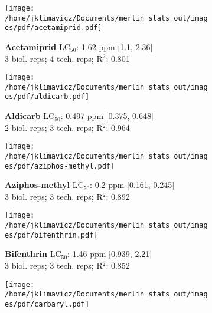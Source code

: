 \documentclass{article}
\author{James Klimavicz}
\date{\today}
\begin{document}
\begin{figure}[thp!]
   \begin{subfigure}{0.500\textwidth}
      \centering
      \texttt{[image: /home/jklimavicz/Documents/merlin\_stats\_out/images/pdf/acetamiprid.pdf]}
      \vspace{-0.05cm}
      \caption*{\textbf{Acetamiprid} LC$_{50}$: 1.62 ppm [1.1, 2.36] \\ 
3 biol. reps; 4 tech. reps; R$^2$: 0.801}
      \vspace{0.1cm}
   \end{subfigure}%
   \begin{subfigure}{0.500\textwidth}
      \centering
      \texttt{[image: /home/jklimavicz/Documents/merlin\_stats\_out/images/pdf/aldicarb.pdf]}
      \vspace{-0.05cm}
      \caption*{\textbf{Aldicarb} LC$_{50}$: 0.497 ppm [0.375, 0.648] \\ 
2 biol. reps; 3 tech. reps; R$^2$: 0.964}
      \vspace{0.1cm}
   \end{subfigure}%
\vspace{-0.1cm}
   \begin{subfigure}{0.500\textwidth}
      \centering
      \texttt{[image: /home/jklimavicz/Documents/merlin\_stats\_out/images/pdf/aziphos-methyl.pdf]}
      \vspace{-0.05cm}
      \caption*{\textbf{Aziphos-methyl} LC$_{50}$: 0.2 ppm [0.161, 0.245] \\ 
3 biol. reps; 3 tech. reps; R$^2$: 0.892}
      \vspace{0.1cm}
   \end{subfigure}%
   \begin{subfigure}{0.500\textwidth}
      \centering
      \texttt{[image: /home/jklimavicz/Documents/merlin\_stats\_out/images/pdf/bifenthrin.pdf]}
      \vspace{-0.05cm}
      \caption*{\textbf{Bifenthrin} LC$_{50}$: 1.46 ppm [0.939, 2.21] \\ 
3 biol. reps; 3 tech. reps; R$^2$: 0.852}
      \vspace{0.1cm}
   \end{subfigure}%
\vspace{-0.1cm}
   \begin{subfigure}{0.500\textwidth}
      \centering
      \texttt{[image: /home/jklimavicz/Documents/merlin\_stats\_out/images/pdf/carbaryl.pdf]}

\end{subfigure}
\end{figure}
\end{document}
